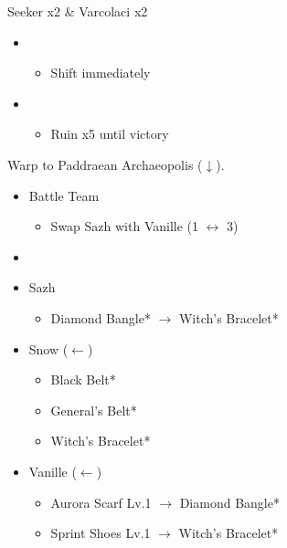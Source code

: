 \begin{battle}{Seeker x2 \& Varcolaci x2}
	\begin{itemize}
		\item \third
			\begin{itemize}
				\item Shift immediately
			\end{itemize}
		\item \second
			\begin{itemize}
				\item Ruin x5 until victory
			\end{itemize}
	\end{itemize}
\end{battle}

Warp to Paddraean Archaeopolis ($\downarrow$).

\begin{menu}
	\begin{itemize}
	\paradigm
		\begin{itemize}
			\item Battle Team
				\begin{itemize}
					\item Swap Sazh with Vanille (1 $\leftrightarrow$ 3)
				\end{itemize}
			\item {}%
				{\paradigmline{\rav}{\rav}{\rav}}%
				{\paradigmline{\com}{\com}{\com}}%
				{\paradigmline[4]{(\sab)}{\sen}{(\rav)}}%
				{\paradigmline{(\sab)}{\sen}{\rav}}%
				{\paradigmline{\med}{(\syn)}{(\syn)}}%
				{\paradigmline{\com}{\com}{\med}}%
		\end{itemize}
	\equip
		\begin{itemize}
			\item Sazh
				\begin{itemize}
					\item Diamond Bangle* $\rightarrow$ Witch's Bracelet*
				\end{itemize}
			\item Snow ($\leftarrow$)
				\begin{itemize}
					\item Black Belt*
					\item General's Belt*
					\item Witch's Bracelet*
				\end{itemize}
			\item Vanille ($\leftarrow$)
				\begin{itemize}
					\item Aurora Scarf Lv.1 $\rightarrow$ Diamond Bangle*
					\item Sprint Shoes Lv.1 $\rightarrow$ Witch's Bracelet*
				\end{itemize}
		\end{itemize}
	\end{itemize}
\end{menu}

